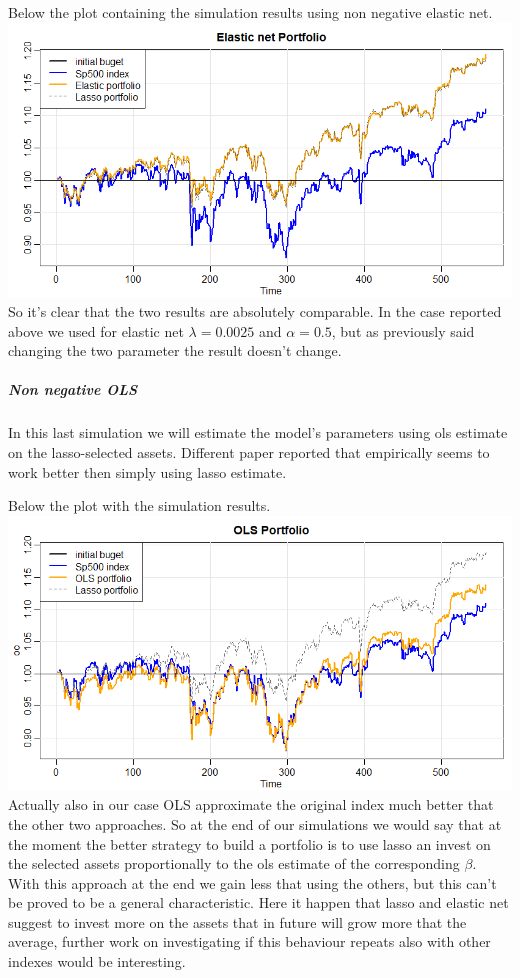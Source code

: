 \documentclass{article}%
\begin{document}
Below the plot containing the simulation results using non negative elastic net.
\\

\includegraphics[scale=0.60]{elasticportfolio}
\\

So it's clear that the two results are absolutely comparable. In the case reported above we used for elastic net $\lambda=0.0025$ and $\alpha=0.5$, but as previously said changing the two parameter the result doesn't change.

\subparagraph{Non negative OLS}
In this last simulation we will estimate the model's parameters using ols estimate on the lasso-selected assets. Different paper reported that empirically seems to work better then simply using lasso estimate. 

Below the plot with the simulation results.
\\

\includegraphics[scale=0.60]{olsportfolio}
\\

Actually also in our case OLS approximate the original index much better that the other two approaches. So at the end of our simulations we would say that at the moment the better strategy to build a portfolio is to use lasso an invest on the selected assets proportionally to the ols estimate of the corresponding $\beta$. 
With this approach at the end we gain less that using the others, but this can't be proved to be a general characteristic. Here it happen that lasso and elastic net suggest to invest more on the assets that in future will grow more that the average, further work on investigating if this behaviour repeats also with other indexes would be interesting.
\end{document}
